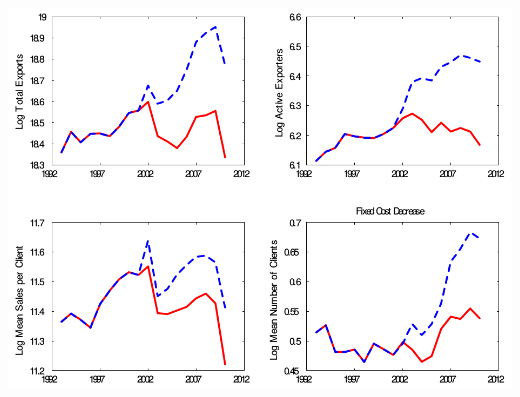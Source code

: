 \documentclass[notes=show]{beamer}
\begin{document}
\begin{frame}%


\begin{center}
    \includegraphics[scale=0.3]{figs/reduction_in_fixed_costs.png}
\end{center}

\end{frame}%
\end{document}
